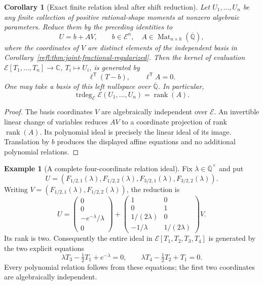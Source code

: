 \documentclass[11pt,a4paper]{article}
\newcommand{\Qbar}{\overline{\mathbb Q}}
\newcommand{\E}{\mathcal E}
\newtheorem{corollary}[theorem]{Corollary}
\theoremstyle{definition}
\newtheorem{example}[theorem]{Example}
\theoremstyle{remark}
\numberwithin{equation}{section}
\begin{document}
\begin{corollary}[Exact finite relation ideal after shift reduction]
\label{refl:cor:fractional-affine-ideal}
Let $U_1,\ldots,U_n$ be any finite collection of positive rational-shape
moments at nonzero algebraic parameters. Reduce them by the preceding
identities to
\[
 U=b+AV,
 \qquad b\in\E^n,\quad
 A\in\operatorname{Mat}_{n\times h}(\Qbar),
\]
where the coordinates of $V$ are distinct elements of the independent
basis in Corollary~\ref{refl:thm:joint-fractional-regularized}. Then the kernel
of evaluation $\E[T_1,\ldots,T_n]\longrightarrow\mathbb C$,
$T_i\mapsto U_i$, is generated by
\[
 \ell^{\mathsf T}(T-b),\qquad \ell^{\mathsf T}A=0.
\]
One may take a basis of this left nullspace over
$\Qbar$. In particular,
\[
 \operatorname{trdeg}_{\E}\E(U_1,\ldots,U_n)
       =\operatorname{rank}(A).
\]
\end{corollary}
\begin{proof}
The basis coordinates $V$ are algebraically independent over
$\E$. An invertible linear change of variables reduces $AV$
to a coordinate projection of rank $\operatorname{rank}(A)$. Its
polynomial ideal is precisely the linear ideal of its image. Translation
by $b$ produces the displayed affine equations and no additional
polynomial relations.
\end{proof}


\begin{example}[A complete four-coordinate relation ideal]
Fix $\lambda\in\Qbar^{\times}$ and put
\[
 U=(F_{1/2,1}(\lambda),F_{1/2,2}(\lambda),
       F_{3/2,1}(\lambda),F_{3/2,2}(\lambda)).
\]
Writing $V=(F_{1/2,1}(\lambda),F_{1/2,2}(\lambda))$, the reduction is
\[
 U=\begin{pmatrix}0\\0\\-e^{-\lambda}/\lambda\\0\end{pmatrix}
 +\begin{pmatrix}
 1&0\\0&1\\1/(2\lambda)&0\\-1/\lambda&1/(2\lambda)
 \end{pmatrix}V.
\]
Its rank is two. Consequently the entire ideal in $\E[T_1,T_2,T_3,T_4]$
is generated by the two explicit equations
\[
 \lambda T_3-\tfrac12T_1+e^{-\lambda}=0,
 \qquad
 \lambda T_4-\tfrac12T_2+T_1=0.
\]
Every polynomial relation follows from these equations; the first two
coordinates are algebraically independent.
\end{example}
\end{document}
